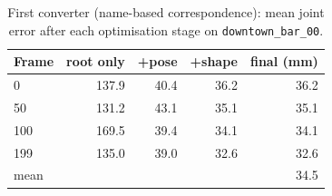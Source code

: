 
\begin{table}[h]
\centering\small
\begin{tabular}{lrrrr}
\toprule
Frame & root only & +pose & +shape & final (mm) \\
\midrule
0   & 137.9 & 40.4 & 36.2 & 36.2 \\
50  & 131.2 & 43.1 & 35.1 & 35.1 \\
100 & 169.5 & 39.4 & 34.1 & 34.1 \\
199 & 135.0 & 39.0 & 32.6 & 32.6 \\
\midrule
mean & & & & 34.5 \\
\bottomrule
\end{tabular}
\caption{First converter (name-based correspondence): mean joint error after
each optimisation stage on \texttt{downtown\_bar\_00}.}
\label{tab:fit}
\end{table}

